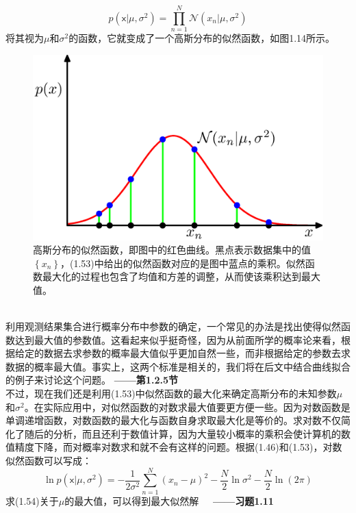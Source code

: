 \documentclass[b5paper]{book}
\numberwithin{equation}{chapter}
\begin{document}
{\begin{equation}
		p(\boldsymbol{\mathsf{x}}|\mu,\sigma^2) = \prod_{n=1}^{N}\mathcal{N}(x_n|\mu,\sigma^2)
	\end{equation}
	\indent 将其视为$\mu$和$\sigma^2$的函数，它就变成了一个高斯分布的似然函数，如图1.14所示。
	\begin{figure}[ht]
		\centering
		\includegraphics[scale=0.8]{Images/1-14.png}
		\caption{高斯分布的似然函数，即图中的红色曲线。黑点表示数据集中的值$\left\{x_n\right\}$，(1.53)中给出的似然函数对应的是图中蓝点的乘积。似然函数最大化的过程也包含了均值和方差的调整，从而使该乘积达到最大值。}
		\label{fig:1-14}	
	\end{figure}
	\\
	\indent 利用观测结果集合进行概率分布中参数的确定，一个常见的办法是找出使得似然函数达到最大值的参数值。这看起来似乎挺奇怪，因为从前面所学的概率论来看，根据给定的数据去求参数的概率最大值似乎更加自然一些，而非根据给定的参数去求数据的概率最大值。事实上，这两个标准是相关的，我们将在后文中结合曲线拟合的例子来讨论这个问题。\color{red} \textbf{——第1.2.5节}　\color{black}\\
	\indent 不过，现在我们还是利用(1.53)中似然函数的最大化来确定高斯分布的未知参数$\mu$和$\sigma^2$。在实际应用中，对似然函数的对数求最大值要更方便一些。因为对数函数是单调递增函数，对数函数的最大化与函数自身求取最大化是等价的。求对数不仅简化了随后的分析，而且还利于数值计算，因为大量较小概率的乘积会使计算机的数值精度下降，而对概率对数求和就不会有这样的问题。根据(1.46)和(1.53)，对数似然函数可以写成：
	\begin{equation}
		\ln p(\boldsymbol{\mathsf{x}}|\mu,\sigma^2)=-\frac{1}{2\sigma^2}\sum_{n=1}^{N}(x_n-\mu)^2-\frac{N}{2}\ln \sigma^2-\frac{N}{2}\ln(2\pi)
	\end{equation}
	\indent 求(1.54)关于$\mu$的最大值，可以得到最大似然解\color{red} \textbf{\ \ ——习题1.11}　\color{black}
}
\end{document}
